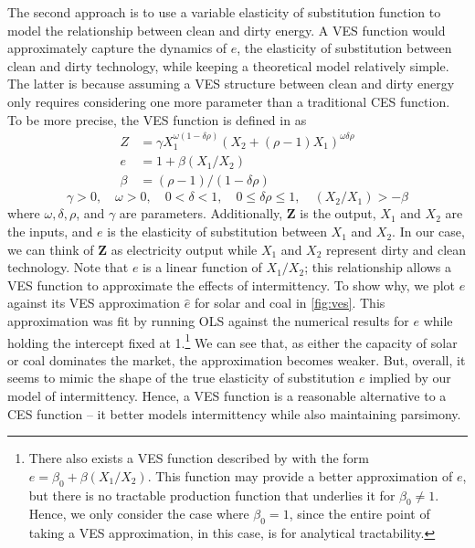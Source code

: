 \documentclass[11pt,a4paper,leqno]{extarticle}
\begin{document}
	
	The second approach is to use a variable elasticity of substitution function to model the relationship between clean and dirty energy.  A VES function would approximately capture the dynamics of $e$, the elasticity of substitution between clean and dirty technology,  while keeping a theoretical model relatively simple. The latter is because assuming a VES structure between clean and dirty energy only requires considering one more parameter than a traditional CES function. To be more precise, the VES function is defined in \citet{VES} as
	\begin{align}
	Z &= \gamma X_1^{\omega(1-\delta \rho)} \left( X_2 + (\rho - 1) X_1 \right)^{\omega \delta \rho} \\
	e &= 1 + \beta (X_1 / X_2) \\
	\beta &= (\rho - 1) / ( 1- \delta \rho ) 
	\end{align}
	\vspace{-4ex}
	$$\gamma > 0, \quad \omega > 0, \quad0 < \delta < 1, \quad 0 \leq \delta \rho \leq 1 , \quad (X_2/X_1) >  -\beta $$
	where $\omega, \delta, \rho$, and $\gamma$ are parameters. Additionally, $\mathbf{Z}$ is the output, $X_1$ and $X_2$ are the inputs, and $e$ is the elasticity of substitution between $X_1$ and $X_2$. In our case, we can think of $\mathbf{Z}$ as electricity output while $X_1$ and $X_2$ represent dirty and clean technology. Note that $e$ is a linear function of $X_1/X_2$; this relationship allows a VES function to approximate the effects of intermittency. To show why, we plot $e$ against its VES approximation $\hat{e}$ for solar and coal in \autoref{fig:ves}. This approximation was fit by running OLS against the numerical results for $e$ while holding the intercept fixed at 1.\footnote{ There also exists a VES function described by \citet{VES} with the form $e = \beta_0 + \beta (X_1/X_2)$. This function may provide a better approximation of $e$, but there is no tractable production function that underlies it for $\beta_0 \neq 1$. Hence, we only consider the case where $\beta_0 = 1$, since the entire point of taking a VES approximation, in this case, is for analytical tractability. } We can see that, as either the capacity of solar or coal dominates the market, the approximation becomes weaker. But, overall, it seems to mimic the shape of the true elasticity of substitution $e$ implied by our model of intermittency. Hence, a  VES function is a reasonable alternative to a CES function -- it better models intermittency while also maintaining parsimony. 
	
\end{document}
